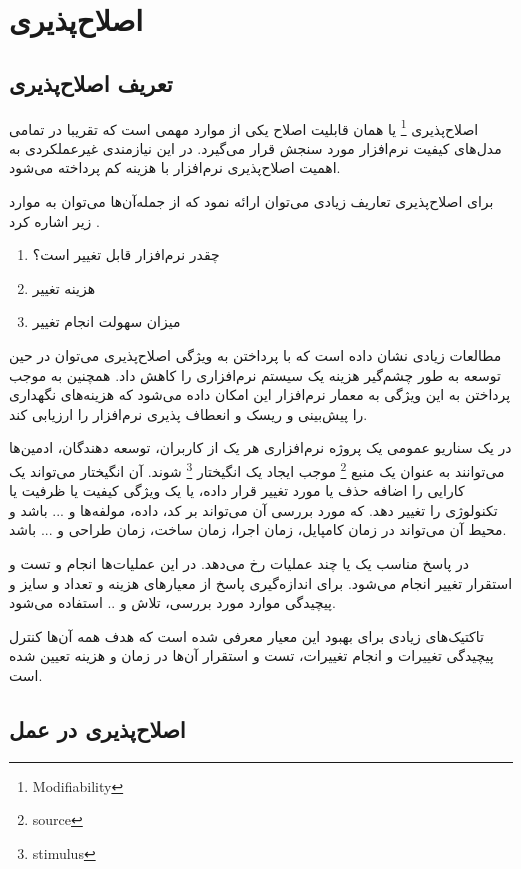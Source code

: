 \chapter{اصلاح‌پذیری}
\section{تعریف اصلاح‌پذیری}
اصلاح‌پذیری
\footnote{Modifiability}
یا همان قابلیت اصلاح یکی از موارد مهمی است که تقریبا در تمامی مدل‌های کیفیت نرم‌افزار مورد سنجش قرار می‌گیرد. در این نیازمندی غیرعملکردی به اهمیت اصلاح‌پذیری نرم‌افزار با هزینه کم پرداخته می‌شود.

برای اصلاح‌پذیری تعاریف زیادی می‌توان ارائه نمود که از جمله‌آن‌ها می‌توان به موارد زیر اشاره کرد \cite{mod:c1-cuibancan-2020}.

\begin{enumerate}
\item
چقدر نرم‌افزار قابل تغییر است؟
\item 
هزینه تغییر 
\item
میزان سهولت انجام تغییر
\end{enumerate}

مطالعات زیادی نشان داده است که با پرداختن به ویژگی اصلاح‌پذیری می‌توان در حین توسعه به طور چشم‌گیر هزینه یک سیستم‌ نرم‌افزاری را کاهش داد.
همچنین به موجب پرداختن به این ویژگی به معمار نرم‌افزار این امکان داده می‌شود که هزینه‌های نگهداری را پیش‌بینی و ریسک و انعطاف پذیری نرم‌افزار را ارزیابی کند.

در یک سناریو عمومی یک پروژه نرم‌افزاری هر یک از کاربران، توسعه دهندگان، ادمین‌ها می‌توانند به عنوان یک منبع 
\footnote{source}
موجب ایجاد
یک انگیختار 
\footnote{stimulus}
شوند. آن انگیختار می‌تواند یک کارایی را اضافه حذف یا مورد تغییر قرار داده، یا یک ویژگی کیفیت یا ظرفیت یا تکنولوژی را تغییر دهد.
که مورد بررسی آن می‌تواند بر کد، داده، مولفه‌ها و ... باشد و محیط آن می‌تواند در زمان کامپایل، زمان اجرا، زمان ساخت، زمان طراحی و ... باشد.

در پاسخ مناسب یک یا چند عملیات رخ می‌دهد. 
در این عملیات‌ها انجام و تست و استقرار تغییر انجام می‌شود.
برای اندازه‌گیری پاسخ از معیار‌‌های هزینه و تعداد و سایز و پیچیدگی موارد مورد بررسی، تلاش و .. استفاده می‌شود.
 
 تاکتیک‌های زیادی برای بهبود این معیار معرفی شده است که هدف همه آن‌ها کنترل پیچیدگی تغییرات و انجام تغییرات، تست و استقرار آن‌ها در زمان و هزینه تعیین شده است.
 
 \section{اصلاح‌پذیری در عمل}
 
 
 